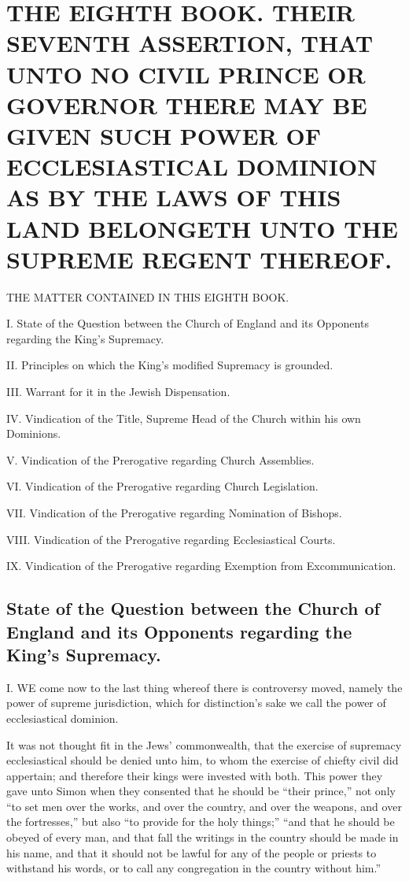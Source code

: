 \chapter*[The Eighth Book]{THE EIGHTH BOOK. 
THEIR SEVENTH ASSERTION, THAT UNTO NO CIVIL PRINCE OR GOVERNOR THERE MAY BE GIVEN SUCH POWER OF ECCLESIASTICAL DOMINION AS BY THE LAWS OF THIS LAND BELONGETH UNTO THE SUPREME REGENT THEREOF.}
\label{chap:book8}

THE MATTER CONTAINED IN THIS EIGHTH BOOK.

I. State of the Question between the Church of England and its Opponents regarding the King’s Supremacy.

II. Principles on which the King’s modified Supremacy is grounded.

III. Warrant for it in the Jewish Dispensation.

IV. Vindication of the Title, Supreme Head of the Church within his own Dominions.

V. Vindication of the Prerogative regarding Church Assemblies.

VI. Vindication of the Prerogative regarding Church Legislation.

VII. Vindication of the Prerogative regarding Nomination of Bishops.

VIII. Vindication of the Prerogative regarding Ecclesiastical Courts.

IX. Vindication of the Prerogative regarding Exemption from Excommunication.

\PRLsep

\section*{State of the Question between the Church of England and its Opponents regarding the King’s Supremacy.}

I. WE come now to the last thing whereof there is controversy moved, namely the power of supreme jurisdiction, which for distinction’s sake we call the power of ecclesiastical dominion.

It was not thought fit in the Jews’ commonwealth, that the exercise of supremacy ecclesiastical should be denied unto him, to whom the exercise of chiefty civil did appertain; and therefore their kings were invested with both. This power they gave unto Simon when they consented that he should be “their prince,” not only “to set men over the works, and over the country, and over the weapons, and over the fortresses,” but also “to provide for the holy things;” “and that he should be obeyed of every man, and that fall the writings in the country should be made in his name, and that it should not be lawful for any of the people or priests to withstand his words, or to call any congregation in the country without him.”

